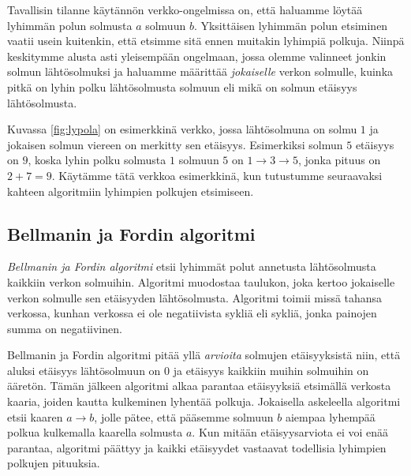 Tavallisin tilanne käytännön verkko-ongelmissa on,
että haluamme löytää lyhimmän polun solmusta $a$ solmuun $b$.
Yksittäisen lyhimmän polun etsiminen vaatii usein kuitenkin,
että etsimme sitä ennen muitakin lyhimpiä polkuja.
Niinpä keskitymme alusta asti yleisempään ongelmaan,
jossa olemme valinneet jonkin solmun lähtösolmuksi
ja haluamme määrittää \emph{jokaiselle} verkon solmulle,
kuinka pitkä on lyhin polku lähtösol\-musta solmuun
eli mikä on solmun etäisyys lähtösolmusta.

Kuvassa \ref{fig:lypola} on esimerkkinä verkko,
jossa lähtösolmuna on solmu $1$ ja jokaisen solmun
viereen on merkitty sen etäisyys.
Esimerkiksi solmun $5$ etäisyys on $9$,
koska lyhin polku solmusta $1$ solmuun $5$ on
$1 \rightarrow 3 \rightarrow 5$, jonka pituus on $2+7=9$.
Käytämme tätä verkkoa esimerkkinä, kun tutustumme
seuraavaksi kahteen algoritmiin lyhimpien polkujen etsimiseen.

\subsection{Bellmanin ja Fordin algoritmi}


\emph{Bellmanin ja Fordin algoritmi} etsii lyhimmät polut
annetusta lähtösolmusta kaikkiin verkon solmuihin.
Algoritmi muodostaa taulukon, joka kertoo jokaiselle
verkon solmulle sen etäisyyden lähtösolmusta.
Algoritmi toimii missä tahansa verkossa,
kunhan verkossa ei ole negatiivista sykliä eli sykliä,
jonka painojen summa on negatiivinen.

Bellmanin ja Fordin algoritmi pitää yllä \emph{arvioita}
solmujen etäisyyksistä niin,
että aluksi etäisyys lähtösolmuun on 0 ja etäisyys
kaikkiin muihin solmuihin on ääretön.
Tämän jälkeen algoritmi alkaa parantaa etäisyyksiä
etsimällä verkosta kaaria, joiden kautta kulkeminen
lyhentää polkuja.
Jokaisella askeleella algoritmi etsii kaaren $a \rightarrow b$,
jolle pätee, että pääsemme solmuun $b$ aiempaa lyhempää polkua
kulkemalla kaarella solmusta $a$.
Kun mitään etäisyysarviota ei voi enää parantaa,
algoritmi päättyy ja kaikki etäisyydet vastaavat
todellisia lyhimpien polkujen pituuksia.

